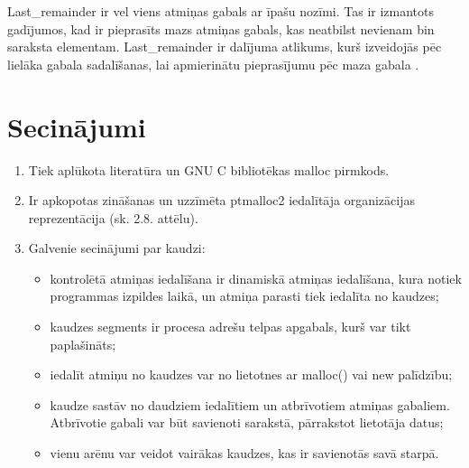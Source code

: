 Last\_remainder ir vel viens atmiņas gabals ar īpašu nozīmi.
Tas ir izmantots gadījumos, kad ir pieprasīts mazs atmiņas gabals, kas neatbilst nevienam bin saraksta elementam. 
Last\_remainder ir dalījuma atlikums, kurš izveidojās pēc lielāka gabala sadalīšanas, lai apmierinātu pieprasījumu pēc maza gabala  \cite {BLACKHAT}.




\section{Secinājumi}
\begin{enumerate}
\item Tiek aplūkota literatūra un GNU C bibliotēkas malloc pirmkods.
\item Ir apkopotas zināšanas un uzzīmēta ptmalloc2 iedalītāja organizācijas reprezentācija  (sk. 2.8. attēlu).
\item Galvenie secinājumi par kaudzi:
    \begin{itemize} \itemsep5pt \parskip5pt 
    \item kontrolētā atmiņas iedalīšana ir dinamiskā atmiņas iedalīšana, kura notiek programmas izpildes laikā, un atmiņa parasti tiek iedalīta no kaudzes;
    \item kaudzes segments ir procesa adrešu telpas apgabals, kurš var tikt paplašināts;
    \item iedalīt atmiņu no kaudzes var no lietotnes ar malloc() vai new palīdzību;
    \item kaudze sastāv no daudziem iedalītiem un atbrīvotiem atmiņas gabaliem.
    Atbrīvotie gabali var būt savienoti sarakstā, pārrakstot lietotāja datus;
    \item vienu arēnu var veidot vairākas kaudzes, kas ir savienotās savā starpā.
    \end{itemize}
    
\end{enumerate}